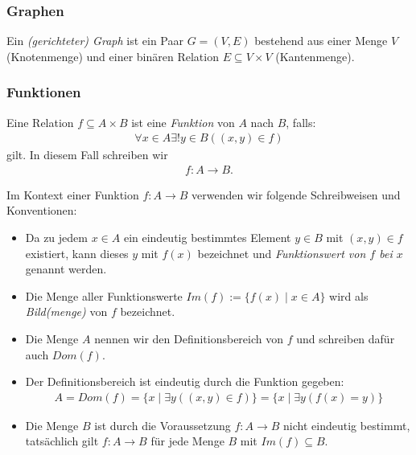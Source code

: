 \subsubsection{Graphen}%
\label{ssub:graphen}
\begin{minipage}{0.9\linewidth}
Ein \textit{(gerichteter) Graph} ist ein Paar $G=(V,E)$ bestehend aus einer Menge $V$ (Knotenmenge) und einer binären Relation $E\subseteq V\times V$ (Kantenmenge).
\end{minipage}

\subsubsection{Funktionen}%
\label{ssub:funktionen}
\begin{minipage}{0.9\linewidth}
Eine Relation $f\subseteq A \times B$ ist eine \textit{Funktion} von $A$ nach $B$, falls:
\begin{align*}
\forall x\in A\exists!y\in B((x,y)\in f)
\end{align*}
gilt. In diesem Fall schreiben wir
\begin{align*}
f:A\to B.
\end{align*}
\end{minipage}

\begin{minipage}{0.9\linewidth}
Im Kontext einer Funktion $f:A\to B$ verwenden wir folgende Schreibweisen und Konventionen:
\begin{itemize}
 \item Da zu jedem $x\in A$ ein eindeutig bestimmtes Element $y\in B$ mit $(x,y)\in f$ existiert, kann dieses $y$ mit $f(x)$ bezeichnet und \textit{Funktionswert von $f$ bei $x$} genannt werden.
 \item Die Menge aller Funktionswerte $Im(f) := \{f(x)\mid x\in A \}$ wird als \textit{Bild(menge)} von $f$ bezeichnet.
 \item Die Menge $A$ nennen wir den Definitionsbereich von $f$ und schreiben dafür auch $Dom(f)$.
 \item Der Definitionsbereich ist eindeutig durch die Funktion gegeben:
  \begin{align*}
   A=Dom(f)=\{x\mid \exists y ((x,y)\in f) \}=\{x\mid \exists y (f(x)=y )\}
  \end{align*}
 \item Die Menge $B$ ist durch die Voraussetzung $f:A\to B$ nicht eindeutig bestimmt, tatsächlich gilt $f:A\to B$ für jede Menge $B$ mit $Im(f)\subseteq B$.
\end{itemize}	
\end{minipage}

